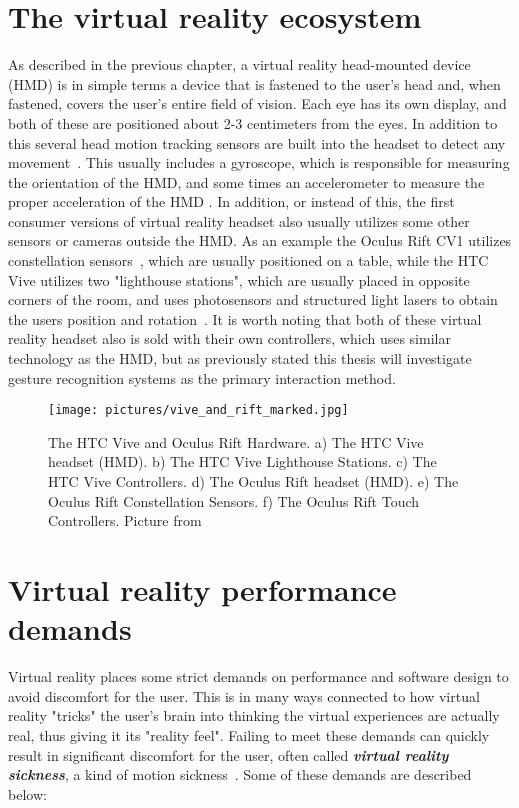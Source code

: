 
\section{The virtual reality ecosystem}
As described in the previous chapter, a virtual reality head-mounted device (HMD) is in simple terms a device that is fastened to the user's head and, when fastened, covers the
user's entire field of vision. Each eye has its own display, and both of these are positioned about 2-3 centimeters from the eyes. In addition to this several head motion
tracking sensors are built into the headset to detect any movement~\citep{POLYGON2016}. This usually includes a gyroscope, which is responsible for measuring the orientation of the
HMD, and some times an accelerometer to measure the proper acceleration of the HMD \citep{THEVERGE2016}. In addition, or instead of this, the first consumer versions of 
virtual reality headset also usually utilizes some other sensors or cameras outside the HMD. As an example the Oculus Rift CV1 utilizes constellation sensors~\cite{VRFOCUS2015}, 
which are usually positioned on a table, while the HTC Vive utilizes two "lighthouse stations", which are usually placed in opposite corners of the room, and uses photosensors and 
structured light lasers to obtain the users position and rotation~\cite{GIZMODO2015}. 
It is worth noting that both of these virtual reality headset also is sold with their own controllers, which uses similar technology as the HMD, but as previously stated this
thesis will investigate gesture recognition systems as the primary interaction method.  

\begin{figure}%
	\texttt{[image: pictures/vive\_and\_rift\_marked.jpg]}
	\caption[The HTC Vive and Oculus Rift Hardware]{The HTC Vive and Oculus Rift Hardware. 
    a) The HTC Vive headset (HMD). b) The HTC Vive Lighthouse Stations. c) The HTC Vive Controllers. d) The Oculus Rift headset (HMD). e) The Oculus Rift Constellation Sensors. 
    f) The Oculus Rift Touch Controllers. Picture from \citet{ROADTOVR2016}}
	\label{fig:vive_and_rift_marked}
\end{figure} 

\section{Virtual reality performance demands}
Virtual reality places some strict demands on performance and software design to avoid discomfort for the user. This is in many ways connected to how virtual reality "tricks" 
the user's brain into thinking the virtual experiences are actually real, thus giving it its "reality feel". Failing to meet these demands can quickly result in significant 
discomfort for the user, often called \textbf{\textit{virtual reality sickness}}, a kind of motion sickness~\citep{ARSTECHNICA2013}. Some of these demands are described below:

